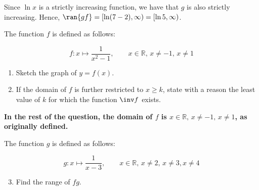 \documentclass{jhwhw}
\begin{document}
            Since $\ln x$ is a strictly increasing function, we have that $g$ is also strictly increasing. Hence, $\ran{gf} = [\ln(7 - 2), \infty) = [\ln 5, \infty)$.
            
            \boxt{
                $\ran{gf} = [\ln 5, \infty)$
            }

    \problem{}
        The function $f$ is defined as follows:

        \begin{equation*}
            f \colon x \mapsto \dfrac1{x^2 - 1}, \qquad x \in \mathbb{R}, \, x \neq -1, \, x \neq 1
        \end{equation*}

        \begin{enumerate}
            \item Sketch the graph of $y = f(x)$.
            \item If the domain of $f$ is further restricted to $x \geq k$, state with a reason the least value of $k$ for which the function $\inv f$ exists.
        \end{enumerate}

        \noindent \textbf{In the rest of the question, the domain of $f$ is $x \in \mathbb{R}, \, x \neq -1, \, x \neq 1$, as originally defined.}

        \smallskip

        \noindent The function $g$ is defined as follows:

        \begin{equation*}
            g \colon x \mapsto \dfrac1{x-3}, \qquad x \in \mathbb{R}, \, x \neq 2, \, x \neq 3, x \neq 4
        \end{equation*}

        \begin{enumerate}
            \setcounter{enumi}{2}
            \item Find the range of $fg$.
        \end{enumerate}
    
    \solution
\end{document}
